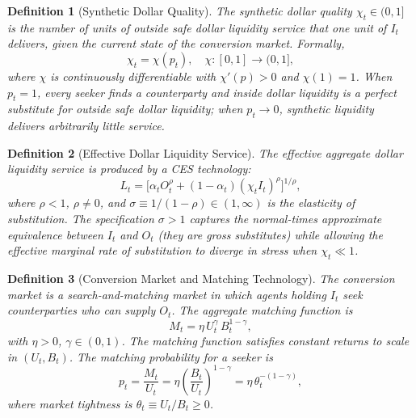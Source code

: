 \documentclass[12pt]{article}
\newtheorem{definition}{Definition}
\theoremstyle{definition}
\newcommand{\1}[1]{\mathds{1}\left[#1\right]}
\begin{document}
\begin{definition}[Synthetic Dollar Quality]
  \label{def:quality}
  The \emph{synthetic dollar quality} $\chi_t \in (0,1]$ is the number of units
  of outside safe dollar liquidity service that one unit of $I_t$ delivers,
  given the current state of the conversion market. Formally,
  \[
    \chi_t = \chi(p_t), \quad \chi\colon [0,1] \to (0,1],
  \]
  where $\chi$ is continuously differentiable with $\chi'(p) > 0$ and
  $\chi(1) = 1$. When $p_t = 1$, every seeker finds a counterparty and inside
  dollar liquidity is a perfect substitute for outside safe dollar liquidity;
  when $p_t \to 0$, synthetic liquidity delivers arbitrarily little service.
\end{definition}

\begin{definition}[Effective Dollar Liquidity Service]
  \label{def:CES}
  The \emph{effective aggregate dollar liquidity service} is produced by a CES
  technology:
  \begin{equation}
    L_t = \bigl[\alpha_t O_t^{\rho} + (1-\alpha_t)(\chi_t I_t)^{\rho}\bigr]^{1/\rho},
    \label{eq:CES}
  \end{equation}
  where $\rho < 1$, $\rho \neq 0$, and $\sigma \equiv 1/(1-\rho) \in (1, \infty)$
  is the elasticity of substitution. The specification $\sigma > 1$ captures the
  normal-times approximate equivalence between $I_t$ and $O_t$ (they are gross
  substitutes) while allowing the effective marginal rate of substitution to
  diverge in stress when $\chi_t \ll 1$.
\end{definition}

\begin{definition}[Conversion Market and Matching Technology]
  \label{def:matching}
  The \emph{conversion market} is a search-and-matching market in which agents
  holding $I_t$ seek counterparties who can supply $O_t$. The aggregate matching
  function is
  \begin{equation}
    M_t = \eta\, U_t^{\gamma}\, B_t^{1-\gamma},
    \label{eq:matching}
  \end{equation}
  with $\eta > 0$, $\gamma \in (0,1)$. The matching function satisfies constant
  returns to scale in $(U_t, B_t)$. The \emph{matching probability} for a seeker
  is
  \begin{equation}
    p_t = \frac{M_t}{U_t} = \eta\left(\frac{B_t}{U_t}\right)^{1-\gamma}
        = \eta\,\theta_t^{-(1-\gamma)},
    \label{eq:match-prob}
  \end{equation}
  where \emph{market tightness} is $\theta_t \equiv U_t/B_t \geq 0$.
\end{definition}
\end{document}
